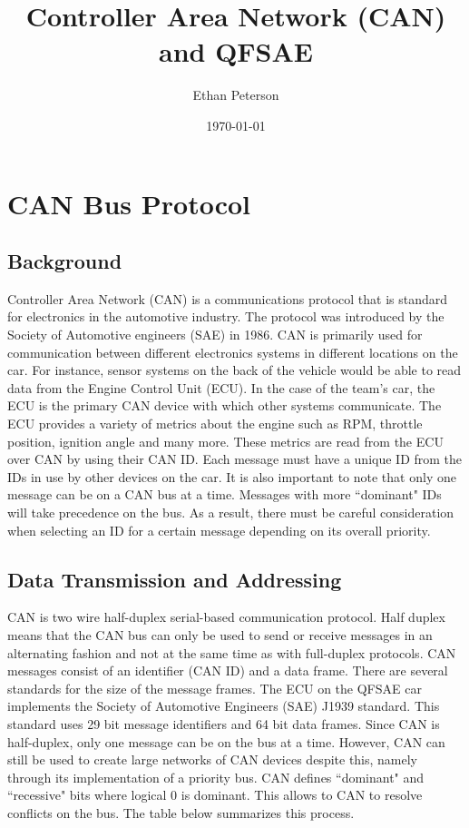 \documentclass[letterpaper]{article}
\title{Controller Area Network (CAN) and QFSAE}
\author{Ethan Peterson}
\date{\today}
\begin{document}
\maketitle

\section{CAN Bus Protocol}

\subsection{Background}
Controller Area Network (CAN) is a communications protocol that is standard for
electronics in the automotive industry. The protocol was introduced by the
Society of Automotive engineers (SAE) in 1986. CAN is primarily used for
communication between different electronics systems in different locations on
the car. For instance, sensor systems on the back of the vehicle would be able to
read data from the Engine Control Unit (ECU). In the case of the team's car, the
ECU is the primary CAN device with which other systems communicate. The ECU
provides a variety of metrics about the engine such as RPM, throttle position,
ignition angle and many more. These metrics are read from the ECU over CAN by
using their CAN ID. Each message must have a unique ID from the IDs in use by
other devices on the car. It is also important to note that only one message can
be on a CAN bus at a time. Messages with more ``dominant" IDs will take
precedence on the bus. As a result, there must be careful consideration when
selecting an ID for a certain message depending on its overall priority.

\subsection{Data Transmission and Addressing}
CAN is two wire half-duplex serial-based communication protocol. Half duplex
means that the CAN bus can only be used to send or receive messages in an
alternating fashion and not at the same time as with full-duplex protocols. CAN
messages consist of an identifier (CAN ID) and a data frame. There are several
standards for the size of the message frames. The ECU on the QFSAE car
implements the Society of Automotive Engineers (SAE) J1939 standard. This
standard uses 29 bit message identifiers and 64 bit data frames. Since CAN is
half-duplex, only one message can be on the bus at a time. However, CAN can
still be used to create large networks of CAN devices despite this, namely through
its implementation of a priority bus. CAN defines ``dominant" and ``recessive"
bits where logical 0 is dominant. This allows to CAN to resolve conflicts on the
bus. The table below summarizes this process.
\end{document}
